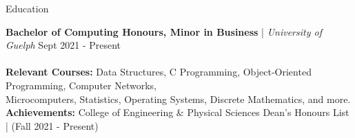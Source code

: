 \begin{rSection}{Education}

\textbf{Bachelor of Computing Honours, Minor in Business} | \textit{University of Guelph} \hfill {Sept 2021 - Present}\\
\vspace{-0.9em}\\
\hspace*{1em} \small \textbf{Relevant Courses:} \small \hspace*{0.6em} Data Structures, C Programming, Object-Oriented Programming, Computer Networks, \\ \hspace*{11.6em} Microcomputers, Statistics, Operating Systems, Discrete Mathematics, and more. \normalsize \vspace{0.2em} \\ 
\hspace*{1em} \small \textbf{Achievements:} \hspace*{2.4em}  \small College of Engineering \& Physical Sciences Dean’s Honours List | (Fall 2021 - Present)
\end{rSection}
